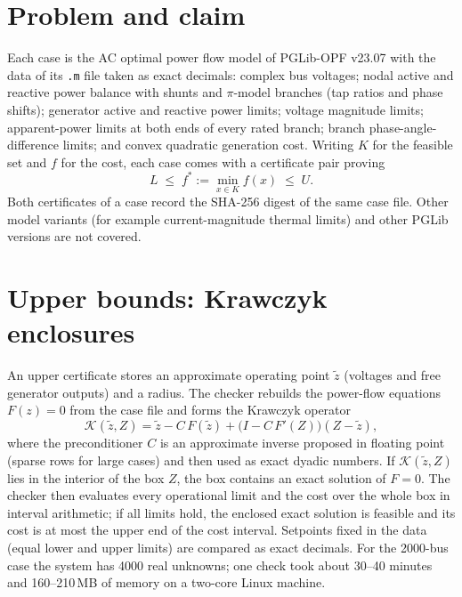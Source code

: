 \documentclass[10pt]{article}
\begin{document}
\section{Problem and claim}
Each case is the AC optimal power flow model of PGLib-OPF v23.07 \cite{pglib} with the data of its \texttt{.m} file taken as
exact decimals: complex bus voltages; nodal active and reactive power balance with shunts and $\pi$-model branches (tap
ratios and phase shifts); generator active and reactive power limits; voltage magnitude limits; apparent-power limits at
both ends of every rated branch; branch phase-angle-difference limits; and convex quadratic generation cost. Writing $K$
for the feasible set and $f$ for the cost, each case comes with a certificate pair proving
\begin{equation}
L \;\le\; f^\ast := \min_{x\in K} f(x) \;\le\; U .
\end{equation}
Both certificates of a case record the SHA-256 digest of the same case file. Other model variants (for example
current-magnitude thermal limits) and other PGLib versions are not covered.

\section{Upper bounds: Krawczyk enclosures}
An upper certificate stores an approximate operating point $\tilde z$ (voltages and free generator outputs) and a radius.
The checker rebuilds the power-flow equations $F(z)=0$ from the case file and forms the Krawczyk operator \cite{krawczyk}
\[
\mathcal K(\tilde z,Z)=\tilde z-C\,F(\tilde z)+\bigl(I-C\,F'(Z)\bigr)(Z-\tilde z),
\]
where the preconditioner $C$ is an approximate inverse proposed in floating point (sparse rows for large cases) and then
used as exact dyadic numbers. If $\mathcal K(\tilde z,Z)$ lies in the interior of the box $Z$, the box contains an exact
solution of $F=0$. The checker then evaluates every operational limit and the cost over the whole box in interval
arithmetic; if all limits hold, the enclosed exact solution is feasible and its cost is at most the upper end of the cost
interval. Setpoints fixed in the data (equal lower and upper limits) are compared as exact decimals. For the 2000-bus case
the system has 4000 real unknowns; one check took about 30--40 minutes and 160--210\,MB of memory on a two-core Linux
machine.
\end{document}

